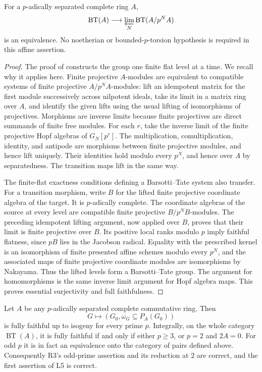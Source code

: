 \begin{lemma}
\label{B:effectivity}
For a $p$-adically separated complete ring $A$,
\[
 \operatorname{BT}(A)\longrightarrow
 \varprojlim_N\operatorname{BT}(A/p^NA)
\]
is an equivalence. No noetherian or bounded-$p$-torsion hypothesis is
required in this affine assertion.
\end{lemma}

\begin{proof}
The proof of \cite[Lemma 2.4.4]{B:deJong1995} constructs the group one
finite flat level at a time. We recall why it applies here. Finite
projective $A$-modules are equivalent to compatible systems of finite
projective $A/p^N A$-modules: lift an idempotent matrix for the first
module successively across nilpotent ideals, take its limit in a matrix
ring over $A$, and identify the given lifts using the usual lifting of
isomorphisms of projectives. Morphisms are inverse limits because
finite projectives are direct summands of finite free modules.
For each $r$, take the inverse limit of the finite projective Hopf
algebras of $G_N[p^r]$. The multiplication, comultiplication, identity,
and antipode are morphisms between finite projective modules, and hence
lift uniquely. Their identities hold modulo every $p^N$, and hence
over $A$ by separatedness. The transition maps lift in the same way.

The finite-flat exactness conditions defining a Barsotti--Tate system
also transfer. For a transition morphism, write $B$ for the lifted
finite projective coordinate algebra of the target. It is $p$-adically
complete. The coordinate algebras of the source at every level are
compatible finite projective $B/p^N B$-modules. The preceding
idempotent lifting argument, now applied over $B$, proves that their
limit is finite projective over $B$. Its positive local ranks modulo
$p$ imply faithful flatness, since $pB$ lies in the Jacobson radical.
Equality with the prescribed
kernel is an isomorphism of finite presented affine schemes modulo
every $p^N$, and the associated maps of finite projective coordinate
modules are isomorphisms by Nakayama. Thus the lifted levels form a
Barsotti--Tate group. The argument for homomorphisms is the same inverse
limit argument for Hopf algebra maps. This proves essential
surjectivity and full faithfulness.
\end{proof}

\begin{theorem}
\label{B:NiceV}
Let $A$ be any $p$-adically separated complete commutative ring. Then
\[
 G\longmapsto(G_0,\omega_G\subseteq P_A(G_0))
\]
is fully faithful up to isogeny for every prime $p$. Integrally, on the
whole category $\operatorname{BT}(A)$, it is fully faithful if and only
if either $p\geq3$, or $p=2$ and $2A=0$.
For odd $p$ it is in fact an equivalence onto the category of pairs
defined above. Consequently R3's odd-prime assertion and its reduction
at $2$ are correct, and the first assertion of L5 is correct.
\end{theorem}

